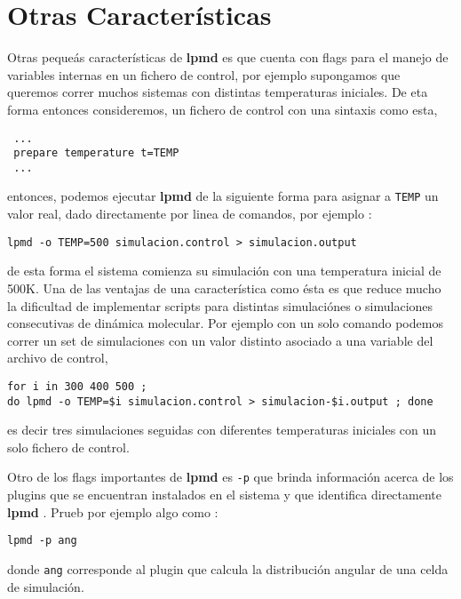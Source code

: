 \documentclass[a4paper,10pt]{scrbook}
\newcommand{\lpmd}{\textbf{lpmd }}
\begin{document}
\section{Otras Caracter\'isticas}

Otras peque\'as caracter\'isticas de \lpmd es que cuenta con flags para el manejo de variables internas en un fichero de control, por ejemplo supongamos que queremos correr muchos sistemas con distintas temperaturas iniciales. De eta forma entonces consideremos, un fichero de control con una sintaxis como esta,

\begin{verbatim}
 ...
 prepare temperature t=TEMP
 ...
\end{verbatim}

entonces, podemos ejecutar \lpmd de la siguiente forma para asignar a \verb|TEMP| un valor real, dado directamente por linea de comandos, por ejemplo :

\begin{center}
 \texttt{lpmd -o TEMP=500 simulacion.control > simulacion.output}
\end{center}

de esta forma el sistema comienza su simulaci\'on con una temperatura inicial de 500K. Una de las ventajas de una caracter\'istica como \'esta es que reduce mucho la dificultad de implementar scripts para distintas simulaci\'ones o simulaciones consecutivas de din\'amica molecular. Por ejemplo con un solo comando podemos correr un set de simulaciones con un valor distinto asociado a una variable del archivo de control,

\begin{center}
 \texttt{for i in 300 400 500 ; \\do lpmd -o TEMP=\$i simulacion.control > simulacion-\$i.output ; done}
\end{center}

es decir tres simulaciones seguidas con diferentes temperaturas iniciales con un solo fichero de control.


Otro de los flags importantes de \lpmd es \verb|-p| que brinda informaci\'on acerca de los plugins que se encuentran instalados en el sistema y que identifica directamente \lpmd. Prueb por ejemplo algo como :

\begin{center}
 \texttt{lpmd -p ang}
\end{center}

donde \verb|ang| corresponde al plugin que calcula la distribuci\'on angular de una celda de simulaci\'on.
\end{document}
